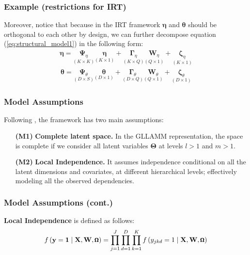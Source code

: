 \documentclass[arial,12pt,xcolor=dvipsnames]{beamer}
\begin{document}
\begin{frame}
	\frametitle{Example (restrictions for IRT)}
	Moreover, notice that because in the IRT framework $\pmb{\eta}$ and $\pmb{\theta}$ should be orthogonal to each other by design, we can further decompose equation (\ref{eq:structural_model1}) in the following form:
	\begin{equation} \label{eq:structural_model2}
		\begin{split}
			\pmb{\eta} = \underset{(K \times K)}{\pmb{\Psi}_{\eta}} \underset{(K \times 1)}{\pmb{\eta}} + \underset{(K \times Q)}{\pmb{\Gamma}_{\eta}} \underset{(Q \times 1)}{\mathbf{W}_{\eta}} + \underset{(K \times 1)}{\pmb{\zeta}_{\eta}}
		\end{split}
	\end{equation}
	\begin{equation} \label{eq:structural_model3}
		\begin{split}
			\pmb{\theta} = \underset{(D \times S)}{\pmb{\Psi}_{\theta}} \underset{(D \times 1)}{\pmb{\theta}} + \underset{(D \times Q)}{\pmb{\Gamma}_{\theta}} \underset{(Q \times 1)}{\mathbf{W}_{\theta}} + \underset{(D \times 1)}{\pmb{\zeta}_{\theta}}
		\end{split}
	\end{equation}
\end{frame}
\begin{frame}
	\frametitle{Model Assumptions}
	Following \citet{Skrondal_et_al_2004a}, the framework has two main assumptions: 
	\begin{enumerate}
		\item[\textbf{(M1)}] \textbf{Complete latent space.}\citep{Hambleton_et_al_1991b} In the GLLAMM representation, the space is complete if we consider all latent variables $\pmb{\Theta}$ at levels $l > 1$ and $m > 1$.
		\item[\textbf{(M2)}] \textbf{Local Independence.} It assumes independence conditional on all the latent dimensions and covariates, at different hierarchical levels; effectively modeling all the observed dependencies.
	\end{enumerate}
\end{frame}
%
\begin{frame}
	\frametitle{Model Assumptions (cont.)}
	\textbf{Local Independence} is defined as follows:
	\begin{equation} \label{eq:independence}
		\footnotesize
		f \left( \mathbf{y} = \mathbf{1} \; | \; \mathbf{X}, \mathbf{W}, \pmb{\Omega} \right) = \prod_{j=1}^{J} \prod_{d=1}^{D} \prod_{k=1}^{K} f \left( y_{jkd}=1 \; | \; \mathbf{X}, \mathbf{W}, \pmb{\Omega} \right)
	\end{equation}
\end{frame}
\end{document}
